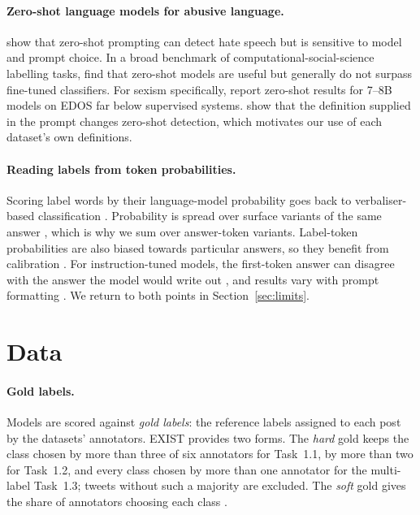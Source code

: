 \documentclass[11pt]{article}
\begin{document}
\paragraph{Zero-shot language models for abusive language.} \citet{plazadelarco2023respectful} show that zero-shot prompting can detect hate speech but is sensitive to model and prompt choice. In a broad benchmark of computational-social-science labelling tasks, \citet{ziems2024css} find that zero-shot models are useful but generally do not surpass fine-tuned classifiers. For sexism specifically, \citet{riahisamani2025rlhf} report zero-shot results for 7--8B models on EDOS far below supervised systems. \citet{reuver2025tell} show that the definition supplied in the prompt changes zero-shot detection, which motivates our use of each dataset's own definitions.

\paragraph{Reading labels from token probabilities.} Scoring label words by their language-model probability goes back to verbaliser-based classification \citep{schick2021exploiting}. Probability is spread over surface variants of the same answer \citep{holtzman2021surface}, which is why we sum over answer-token variants. Label-token probabilities are also biased towards particular answers, so they benefit from calibration \citep{zhao2021calibrate}. For instruction-tuned models, the first-token answer can disagree with the answer the model would write out \citep{wang2024myanswer}, and results vary with prompt formatting \citep{sclar2024quantifying}. We return to both points in Section~\ref{sec:limits}.

\section{Data}\label{sec:data}
\paragraph{Gold labels.} Models are scored against \emph{gold labels}: the reference labels assigned to each post by the datasets' annotators. EXIST provides two forms. The \emph{hard} gold keeps the class chosen by more than three of six annotators for Task~1.1, by more than two for Task~1.2, and every class chosen by more than one annotator for the multi-label Task~1.3; tweets without such a majority are excluded. The \emph{soft} gold gives the share of annotators choosing each class \citep{plaza2025exist}.
\end{document}

